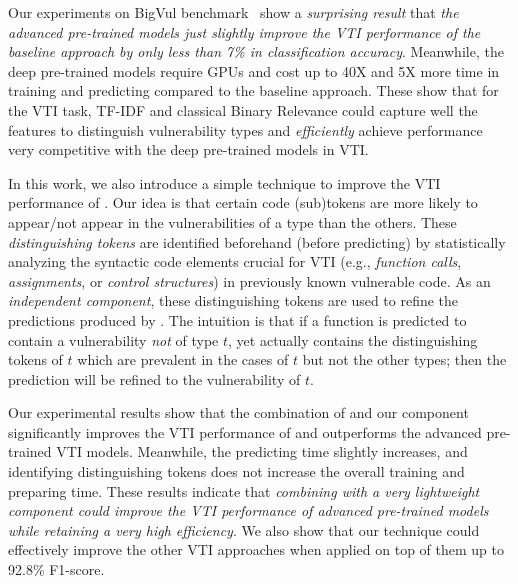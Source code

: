 %
%
Our experiments on BigVul benchmark~\cite{bigvul} show a \textit{surprising result} that \textit{the advanced pre-trained models just slightly improve the VTI performance of the baseline approach by only less than 7\% in classification accuracy}. Meanwhile, the deep pre-trained models require GPUs and cost up to 40X and 5X more time in training and predicting compared to the baseline approach. These show that for the VTI task, TF-IDF and classical Binary Relevance could capture well the features to distinguish vulnerability types and \textit{efficiently} achieve performance very competitive with the deep pre-trained models in VTI.


In this work, we also introduce a simple technique to improve the VTI performance of \base. Our idea is that certain code (sub)tokens are more likely to appear/not appear in the vulnerabilities of a type than the others. 
%
%
%
%
These \textit{distinguishing tokens} are identified beforehand (before predicting) by statistically analyzing the syntactic code elements crucial for VTI (e.g., \textit{function calls}, \textit{assignments}, or \textit{control structures}) in previously known vulnerable code.
As an \textit{independent component}, these distinguishing tokens are used to refine the predictions produced by \base. 
%
The intuition is that if a function is predicted to contain a vulnerability \textit{not} of type $t$, yet actually contains the distinguishing tokens of $t$ which are prevalent in the cases of $t$ but not the other types; then the prediction will be refined to the vulnerability of $t$.

Our experimental results show that the combination of \base and our component significantly improves the VTI performance of \base and outperforms the advanced pre-trained VTI models. Meanwhile, the predicting time slightly increases, and identifying distinguishing tokens does not increase the overall training and preparing time. These results indicate that \textit{\base combining with a very lightweight component could improve the VTI performance of advanced pre-trained models while retaining a very high efficiency}. We also show that our technique could effectively improve the other VTI approaches when applied on top of them up to 92.8\% F1-score.


